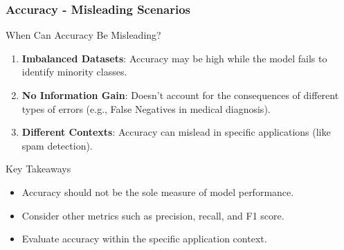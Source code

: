 \documentclass[aspectratio=169]{beamer}
\begin{document}
\begin{frame}[fragile]
    \frametitle{Accuracy - Misleading Scenarios}
    \begin{block}{When Can Accuracy Be Misleading?}
        \begin{enumerate}
            \item \textbf{Imbalanced Datasets}: Accuracy may be high while the model fails to identify minority classes.
            \item \textbf{No Information Gain}: Doesn't account for the consequences of different types of errors (e.g., False Negatives in medical diagnosis).
            \item \textbf{Different Contexts}: Accuracy can mislead in specific applications (like spam detection).
        \end{enumerate}
    \end{block}
    \begin{block}{Key Takeaways}
        \begin{itemize}
            \item Accuracy should not be the sole measure of model performance.
            \item Consider other metrics such as precision, recall, and F1 score.
            \item Evaluate accuracy within the specific application context.
        \end{itemize}
    \end{block}
\end{frame}
\end{document}
